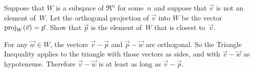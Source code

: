 \begin{exercises}
\item Suppose that $W$ is a subspace of $\Re^n$ for some~$n$ and suppose that
  $\vec{v}$ is not an element of~$W$.
  Let the orthogonal projection of $\vec{v}$ into $W$ be the vector
  $\proj{\vec{v}}{W}=\vec{p}$.
  Show that $\vec{p}$ is the element of~$W$ that is closest to~$\vec{v}$.
  \begin{answer}
    For any $\vec{w}\in W$, the vectors $\vec{v}-\vec{p}$ and
    $\vec{p}-\vec{w}$ are orthogonal.
    So the Triangle Inequality applies to the triangle with those vectors as
    sides, and with $\vec{v}-\vec{w}$ as hypoteneuse.
    Therefore $\vec{v}-\vec{w}$ is at least as long as $\vec{v}-\vec{p}$.
  \end{answer}

   





\end{exercises}
